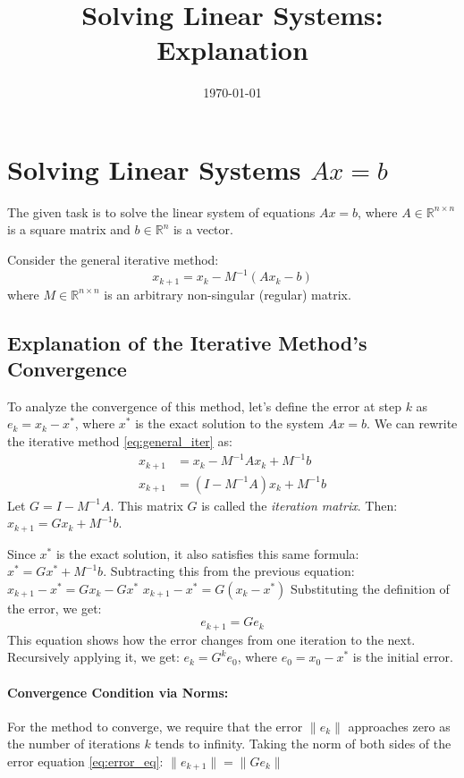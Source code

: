 \documentclass[11pt,a4paper,reqno]{article}
\title{Solving Linear Systems: Explanation}
\author{} %
\date{\today}
\newcommand{\R}{\mathbb{R}}
\begin{document}
\maketitle

\section{Solving Linear Systems $Ax=b$}
\label{sec:lin_systems}

The given task is to solve the linear system of equations $Ax=b$, where $A \in \R^{n \times n}$ is a square matrix and $b \in \R^n$ is a vector.

Consider the general iterative method:
\begin{equation}
  \label{eq:general_iter}
  x_{k+1} = x_k - M^{-1}(Ax_k-b)
\end{equation}
where $M \in \R^{n \times n}$ is an arbitrary non-singular (regular) matrix.

\subsection{Explanation of the Iterative Method's Convergence}
To analyze the convergence of this method, let's define the error at step $k$ as $e_k = x_k - x^*$, where $x^*$ is the exact solution to the system $Ax=b$.
We can rewrite the iterative method \eqref{eq:general_iter} as:
\begin{align*}
  x_{k+1} &= x_k - M^{-1}Ax_k + M^{-1}b \\
  x_{k+1} &= (I - M^{-1}A)x_k + M^{-1}b
\end{align*}
Let $G = I - M^{-1}A$. This matrix $G$ is called the \emph{iteration matrix}. Then:
$x_{k+1} = G x_k + M^{-1}b$.

Since $x^*$ is the exact solution, it also satisfies this same formula: $x^* = G x^* + M^{-1}b$.
Subtracting this from the previous equation:
$x_{k+1} - x^* = G x_k - G x^*$
$x_{k+1} - x^* = G (x_k - x^*)$
Substituting the definition of the error, we get:
\begin{equation}
  \label{eq:error_eq}
  e_{k+1} = G e_k
\end{equation}
This equation shows how the error changes from one iteration to the next. Recursively applying it, we get:
$e_k = G^k e_0$, where $e_0 = x_0 - x^*$ is the initial error.

\paragraph{Convergence Condition via Norms:}
For the method to converge, we require that the error $\|e_k\|$ approaches zero as the number of iterations $k$ tends to infinity.
Taking the norm of both sides of the error equation \eqref{eq:error_eq}:
$\|e_{k+1}\| = \|G e_k\|$
\end{document}
